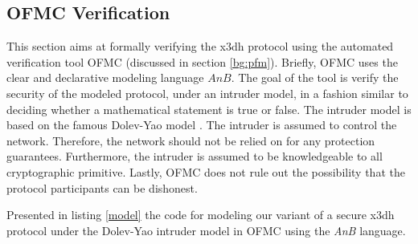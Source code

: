 \subsection{OFMC Verification}
This section aims at formally verifying the \gls{x3dh} protocol using the automated verification tool OFMC (discussed in section \ref{bg:pfm}). Briefly, OFMC uses the clear and declarative modeling language $AnB$. The goal of the tool is verify the security of the modeled protocol, under an intruder model, in a fashion similar to deciding whether a mathematical statement is true or false. The intruder model is based on the famous Dolev-Yao model \cite{dolev1983security}. The intruder is assumed to control the network. Therefore, the network should not be relied on for any protection guarantees. Furthermore, the intruder is assumed to be knowledgeable to all cryptographic primitive. Lastly, OFMC does not rule out the possibility that the protocol participants can be dishonest.

Presented in listing \ref{model} the code for modeling our variant of a secure \gls{x3dh} protocol  under the Dolev-Yao intruder model in OFMC using the \textit{AnB} language.



